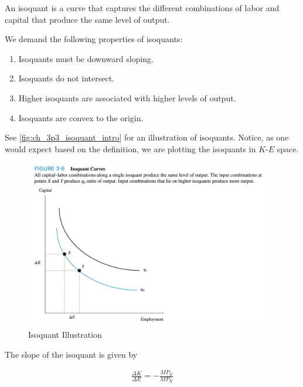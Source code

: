 \begin{definition}[Isoquant] 
    
    An isoquant is a curve that captures the 
    different combinations of labor and capital
    that produce the same level of output.

\end{definition}

We demand the following properties of isoquants:

\begin{enumerate}
    \item Isoquants must be downward sloping.
    \item Isoquants do not intersect.
    \item Higher isoquants are associated with higher levels of output.
    \item Isoquants are convex to the origin.
\end{enumerate}

See \autoref{fig:ch_3p3_isoquant_intro}
for an illustration of isoquants.
Notice, as one would expect based on the 
definition, we are 
plotting the isoquants in $K$-$E$ space.

\FloatBarrier

\begin{figure}[!htb]
    \centering
        \includegraphics[width=0.95\textwidth]{../input/ch_3p3_isoquant_intro.png}
    \caption{Isoquant Illustration}
    \label{fig:ch_3p3_isoquant_intro}
\end{figure}

\FloatBarrier

The slope of the isoquant is given by 

\begin{align}
    \frac{\Delta K}{\Delta E}=-\frac{M P_E}{M P_K}
\end{align}

